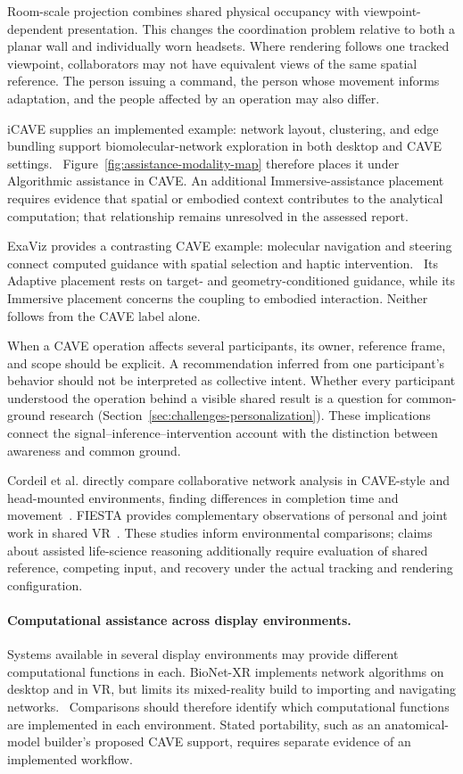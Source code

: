 Room-scale projection combines shared physical occupancy with viewpoint-dependent presentation. This changes the coordination problem relative to both a planar wall and individually worn headsets. Where rendering follows one tracked viewpoint, collaborators may not have equivalent views of the same spatial reference. The person issuing a command, the person whose movement informs adaptation, and the people affected by an operation may also differ.

iCAVE supplies an implemented example: network layout, clustering, and edge bundling support biomolecular-network exploration in both desktop and CAVE settings.~\cite{MapICAVE} Figure~\ref{fig:assistance-modality-map} therefore places it under Algorithmic assistance in CAVE. An additional Immersive-assistance placement requires evidence that spatial or embodied context contributes to the analytical computation; that relationship remains unresolved in the assessed report.

ExaViz provides a contrasting CAVE example: molecular navigation and steering connect computed guidance with spatial selection and haptic intervention.~\cite{MapExaViz} Its Adaptive placement rests on target- and geometry-conditioned guidance, while its Immersive placement concerns the coupling to embodied interaction. Neither follows from the CAVE label alone.

When a CAVE operation affects several participants, its owner, reference frame, and scope should be explicit. A recommendation inferred from one participant's behavior should not be interpreted as collective intent. Whether every participant understood the operation behind a visible shared result is a question for common-ground research (Section~\ref{sec:challenges-personalization}). These implications connect the signal--inference--intervention account with the distinction between awareness and common ground.

Cordeil et al. directly compare collaborative network analysis in CAVE-style and head-mounted environments, finding differences in completion time and movement~\cite{Cordeil2017CollaborativeNetworks}. FIESTA provides complementary observations of personal and joint work in shared VR~\cite{EvalLee2021}. These studies inform environmental comparisons; claims about assisted life-science reasoning additionally require evaluation of shared reference, competing input, and recovery under the actual tracking and rendering configuration.

\paragraph*{Computational assistance across display environments.}
Systems available in several display environments may provide different computational functions in each. BioNet-XR implements network algorithms on desktop and in VR, but limits its mixed-reality build to importing and navigating networks.~\cite{ExpandedE26} Comparisons should therefore identify which computational functions are implemented in each environment. Stated portability, such as an anatomical-model builder's proposed CAVE support, requires separate evidence of an implemented workflow.~\cite{ExpandedE01}

